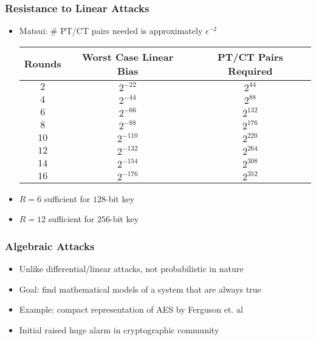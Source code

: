 \begin{frame}
\frametitle{Resistance to Linear Attacks}
\begin{itemize}
  \item Matsui: \# PT/CT pairs needed is approximately $\epsilon^{-2}$ \cite{Matsui1993_Linear}
  \vfill
  \begin{center}
  \begin{small}
  \begin{tabular}{c|c|c}
  Rounds & Worst Case Linear Bias & PT/CT Pairs Required \\
  \hline
  $2$  & $2^{-22}$  & $2^{44}$  \\
  $4$  & $2^{-44}$  & $2^{88}$  \\
  $6$  & $2^{-66}$  & $2^{132}$ \\
  $8$  & $2^{-88}$  & $2^{176}$ \\
  $10$ & $2^{-110}$ & $2^{220}$ \\
  $12$ & $2^{-132}$ & $2^{264}$ \\
  $14$ & $2^{-154}$ & $2^{308}$ \\
  $16$ & $2^{-176}$ & $2^{352}$ \\
  \end{tabular}
  \end{small}
  \end{center}
  \item $R = 6$ sufficient for $128$-bit key
  \item $R = 12$ sufficient for $256$-bit key
\end{itemize}
\end{frame}

\begin{frame}
\frametitle{Algebraic Attacks}
\begin{itemize}
  \item Unlike differential/linear attacks, not probabilistic in nature
  \item Goal: find mathematical models of a system that are always true
  \item Example: compact representation of AES by Ferguson et. al\ \cite{Ferguson2001_AlgebraicRijndael}
  \item Initial raised huge alarm in cryptographic community
\end{itemize}
\end{frame}

